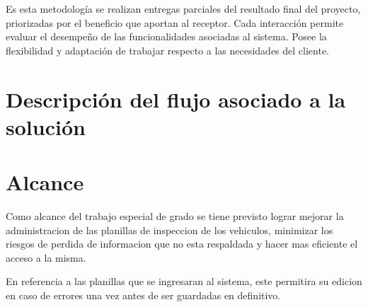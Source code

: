 Es esta metodología se realizan entregas parciales del resultado final del proyecto, priorizadas por el beneficio que aportan al receptor. Cada interacción permite evaluar el desempeño de las funcionalidades asociadas al sistema. Posee la flexibilidad y adaptación de trabajar respecto a las necesidades del cliente. 

\setlength{\parskip}{0mm}

\section{Descripción del flujo asociado a la solución}


\section{Alcance}

Como alcance del trabajo especial de grado se tiene previsto lograr mejorar la administracion de las planillas de inspeccion de los vehiculos, minimizar los riesgos de perdida de informacion que no esta respaldada y hacer mas eficiente el acceso a la misma.

En referencia a las planillas que se ingresaran al sistema, este permitira su edicion en caso de errores una vez antes de ser guardadas en definitivo.
